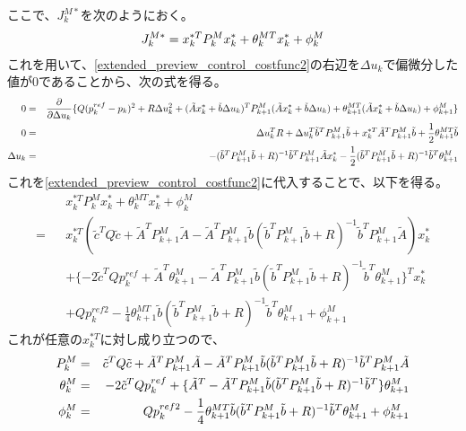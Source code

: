 ここで、$J_k^{M\ast}$を次のようにおく。
\begin{eqnarray}
  J_k^{M\ast} = x_k^{\ast T} P_k^M x_k^\ast + \theta_k^{MT} x_k^\ast + \phi_k^M \eqlabel{extended_preview_control_J}
\end{eqnarray}
これを用いて、\eqref{extended_preview_control_costfunc2}の右辺を$\Delta u_k$で偏微分した値が0であることから、次の式を得る。
\begin{eqnarray}
  0 = && \frac{\partial}{\partial \Delta u_k} \{ Q(p_k^{ref} - p_k)^2 + R\Delta u_k^2 + (\tilde{A} x^\ast_k + \tilde{b} \Delta u_k)^T P_{k+1}^M (\tilde{A} x^\ast_k + \tilde{b} \Delta u_k) + \theta_{k+1}^{MT} (\tilde{A} x^\ast_k + \tilde{b} \Delta u_k) + \phi_{k+1}^M \} \nonumber\\
  0 =&& \Delta u_k^T R + \Delta u_k^T \tilde{b}^T P_{k+1}^M \tilde{b} + x_k^{\ast T} \tilde{A}^T P_{k+1}^M \tilde{b} + \frac{1}{2} \theta_{k+1}^{MT} \tilde{b} \nonumber \\
  \Delta u_k =&& -(\tilde{b}^T P_{k+1}^M \tilde{b} + R )^{-1} \tilde{b}^T P_{k+1}^M \tilde{A} x_k^\ast - \frac{1}{2} (\tilde{b}^T P_{k+1}^M \tilde{b} + R )^{-1} \tilde{b}^T \theta_{k+1}^M\eqlabel{extended_preview_control_u}
\end{eqnarray}
これを\eqref{extended_preview_control_costfunc2}に代入することで、以下を得る。
\begin{eqnarray}
  && x_k^{\ast T} P_k^M x_k^\ast + \theta_k^{M T} x_k^\ast + \phi_k^M \nonumber \\
  =&& x_k^{\ast T} (\tilde{c}^T Q \tilde{c} + \tilde{A}^T P_{k+1}^M \tilde{A} - \tilde{A}^T P_{k+1}^M \tilde{b} (\tilde{b}^T P_{k+1}^M \tilde{b} + R )^{-1} \tilde{b}^T P_{k+1}^M \tilde{A}) x_k^\ast \nonumber\\
  && + \{-2 \tilde{c}^T Q p_k^{ref} + \tilde{A}^T \theta_{k+1}^M - \tilde{A}^T P_{k+1}^M \tilde{b} (\tilde{b}^T P_{k+1}^M \tilde{b} + R )^{-1} \tilde{b}^T \theta_{k+1}^M \}^T x_k^\ast \nonumber\\
  && + Q p_k^{ref 2} - \frac{1}{4} \theta_{k+1}^{MT} \tilde{b} (\tilde{b}^T P_{k+1}^M \tilde{b} + R )^{-1} \tilde{b}^T \theta_{k+1}^M + \phi_{k+1}^M
\end{eqnarray}
これが任意の$x_k^{\ast T}$に対し成り立つので、
\begin{eqnarray}
  P_k^M &=& \tilde{c}^T Q \tilde{c} + \tilde{A}^T P_{k+1}^M \tilde{A} - \tilde{A}^T P_{k+1}^M \tilde{b} (\tilde{b}^T P_{k+1}^M \tilde{b} + R )^{-1} \tilde{b}^T P_{k+1}^M \tilde{A} \eqlabel{extended_preview_control_P}\\
  \theta_k^M &=& -2 \tilde{c}^T Q p_k^{ref} + \{\tilde{A}^T - \tilde{A}^T P_{k+1}^M \tilde{b} (\tilde{b}^T P_{k+1}^M \tilde{b} + R )^{-1} \tilde{b}^T\} \theta_{k+1}^M \eqlabel{extended_preview_control_theta}\\
  \phi_k^M &=& Q p_k^{ref 2} - \frac{1}{4} \theta_{k+1}^{MT} \tilde{b} (\tilde{b}^T P_{k+1}^M \tilde{b} + R )^{-1} \tilde{b}^T \theta_{k+1}^M + \phi_{k+1}^M
\end{eqnarray}
